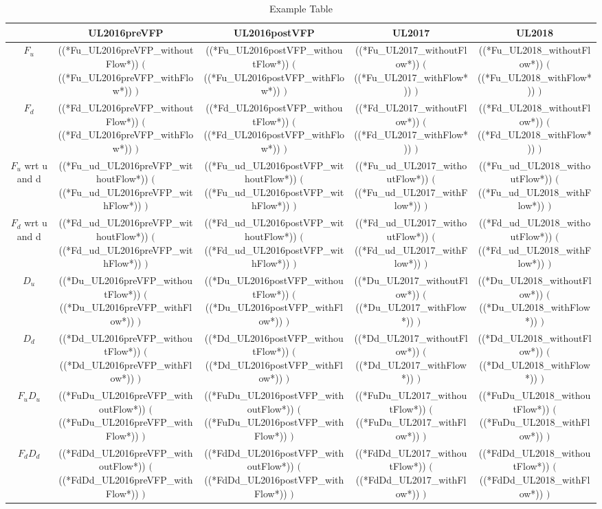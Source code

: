 \documentclass{article}
\begin{document}
\begin{table}[htbp]
    \centering
    \begin{tabular}{|c|c|c|c|c|}
        \hline
        \textbf{} & \textbf{UL2016preVFP} & \textbf{UL2016postVFP} & \textbf{UL2017} & \textbf{UL2018}\\
        \hline
        $F_u$ & ((*Fu_UL2016preVFP_withoutFlow*)) $($ ((*Fu_UL2016preVFP_withFlow*)) $)$ & ((*Fu_UL2016postVFP_withoutFlow*)) $($ ((*Fu_UL2016postVFP_withFlow*)) $)$ & ((*Fu_UL2017_withoutFlow*)) $($ ((*Fu_UL2017_withFlow*)) $)$ & ((*Fu_UL2018_withoutFlow*)) $($ ((*Fu_UL2018_withFlow*)) $)$ \\
        $F_d$ & ((*Fd_UL2016preVFP_withoutFlow*)) $($ ((*Fd_UL2016preVFP_withFlow*)) $)$ & ((*Fd_UL2016postVFP_withoutFlow*)) $($ ((*Fd_UL2016postVFP_withFlow*)) $)$ & ((*Fd_UL2017_withoutFlow*)) $($ ((*Fd_UL2017_withFlow*)) $)$ & ((*Fd_UL2018_withoutFlow*)) $($ ((*Fd_UL2018_withFlow*)) $)$ \\
        $F_u$ wrt u and d & ((*Fu_ud_UL2016preVFP_withoutFlow*)) $($ ((*Fu_ud_UL2016preVFP_withFlow*)) $)$ & ((*Fu_ud_UL2016postVFP_withoutFlow*)) $($ ((*Fu_ud_UL2016postVFP_withFlow*)) $)$ & ((*Fu_ud_UL2017_withoutFlow*)) $($ ((*Fu_ud_UL2017_withFlow*)) $)$ & ((*Fu_ud_UL2018_withoutFlow*)) $($ ((*Fu_ud_UL2018_withFlow*)) $)$ \\
        $F_d$ wrt u and d & ((*Fd_ud_UL2016preVFP_withoutFlow*)) $($ ((*Fd_ud_UL2016preVFP_withFlow*)) $)$ & ((*Fd_ud_UL2016postVFP_withoutFlow*)) $($ ((*Fd_ud_UL2016postVFP_withFlow*)) $)$ & ((*Fd_ud_UL2017_withoutFlow*)) $($ ((*Fd_ud_UL2017_withFlow*)) $)$ & ((*Fd_ud_UL2018_withoutFlow*)) $($ ((*Fd_ud_UL2018_withFlow*)) $)$ \\
        $D_u$ & ((*Du_UL2016preVFP_withoutFlow*)) $($ ((*Du_UL2016preVFP_withFlow*)) $)$ & ((*Du_UL2016postVFP_withoutFlow*)) $($ ((*Du_UL2016postVFP_withFlow*)) $)$ & ((*Du_UL2017_withoutFlow*)) $($ ((*Du_UL2017_withFlow*)) $)$ & ((*Du_UL2018_withoutFlow*)) $($ ((*Du_UL2018_withFlow*)) $)$ \\
        $D_d$ & ((*Dd_UL2016preVFP_withoutFlow*)) $($ ((*Dd_UL2016preVFP_withFlow*)) $)$ & ((*Dd_UL2016postVFP_withoutFlow*)) $($ ((*Dd_UL2016postVFP_withFlow*)) $)$ & ((*Dd_UL2017_withoutFlow*)) $($ ((*Dd_UL2017_withFlow*)) $)$ & ((*Dd_UL2018_withoutFlow*)) $($ ((*Dd_UL2018_withFlow*)) $)$ \\
        $F_u D_u$ & ((*FuDu_UL2016preVFP_withoutFlow*)) $($ ((*FuDu_UL2016preVFP_withFlow*)) $)$ & ((*FuDu_UL2016postVFP_withoutFlow*)) $($ ((*FuDu_UL2016postVFP_withFlow*)) $)$ & ((*FuDu_UL2017_withoutFlow*)) $($ ((*FuDu_UL2017_withFlow*)) $)$ & ((*FuDu_UL2018_withoutFlow*)) $($ ((*FuDu_UL2018_withFlow*)) $)$ \\
        $F_d D_d$ & ((*FdDd_UL2016preVFP_withoutFlow*)) $($ ((*FdDd_UL2016preVFP_withFlow*)) $)$ & ((*FdDd_UL2016postVFP_withoutFlow*)) $($ ((*FdDd_UL2016postVFP_withFlow*)) $)$ & ((*FdDd_UL2017_withoutFlow*)) $($ ((*FdDd_UL2017_withFlow*)) $)$ & ((*FdDd_UL2018_withoutFlow*)) $($ ((*FdDd_UL2018_withFlow*)) $)$ \\
        \hline
    \end{tabular}
    \caption{Example Table}
    \label{tab:example}
\end{table}
\end{document}
